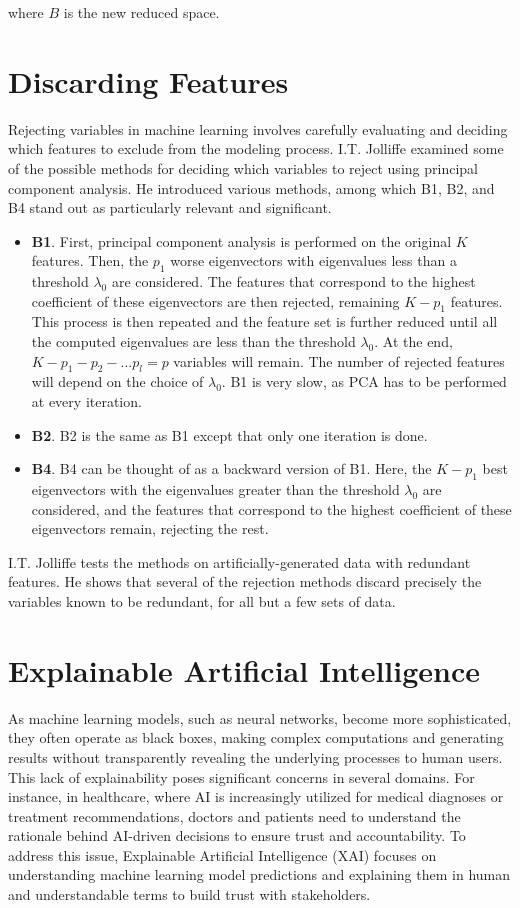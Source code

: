 where $B$ is the new reduced space.

\section{Discarding Features}

Rejecting variables in machine learning involves carefully evaluating and deciding which features to exclude from the modeling process. I.T. Jolliffe \cite{b2b4} examined some of the possible methods for deciding which variables to reject using principal component analysis. He introduced various methods, among which B1, B2, and B4 stand out as particularly relevant and significant.

\begin{itemize}
    \item \textbf{B1}. First, principal component analysis is performed on the original $K$ features. Then, the $p_1$ worse eigenvectors with eigenvalues less than a threshold $\lambda_0$ are considered. The features that correspond to the highest coefficient of these eigenvectors are then rejected, remaining $K-p_1$ features. This process is then repeated and the feature set is further reduced until all the computed eigenvalues are less than the threshold $\lambda_0$. At the end, $K - p_1 - p_2 - ... p_l = p$ variables will remain. The number of rejected features will depend on the choice of $\lambda_0$. B1 is very slow, as PCA has to be performed at every iteration.
    \item \textbf{B2}. B2 is the same as B1 except that only one iteration is done.
    \item \textbf{B4}. B4 can be thought of as a backward version of B1. Here, the $K-p_1$ best eigenvectors with the eigenvalues greater than the threshold $\lambda_0$ are considered, and the features that correspond to the highest coefficient of these eigenvectors remain, rejecting the rest.
\end{itemize}

I.T. Jolliffe tests the methods on artificially-generated data with redundant features. He shows that several of the rejection methods discard precisely the variables known to be redundant, for all but a few sets of data.


\section{Explainable Artificial Intelligence}

As machine learning models, such as neural networks, become more sophisticated, they often operate as black boxes, making complex computations and generating results without transparently revealing the underlying processes to human users. This lack of explainability poses significant concerns in several domains. For instance, in healthcare, where AI is increasingly utilized for medical diagnoses or treatment recommendations, doctors and patients need to understand the rationale behind AI-driven decisions to ensure trust and accountability.
To address this issue, Explainable Artificial Intelligence \cite{xai} (XAI) focuses on understanding machine learning model predictions and explaining them in human and understandable terms to build trust with stakeholders.

